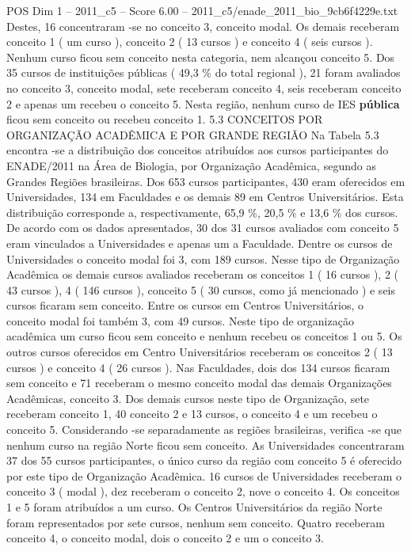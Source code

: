 \begin{textsample}{POS Dim 1 – 2011\_c5 – Score 6.00 – 2011\_c5/enade\_2011\_bio\_9cb6f4229e.txt}
Destes, 16 concentraram -se no conceito 3, conceito modal.
Os demais receberam conceito 1 ( um curso ), conceito 2 ( 13 cursos ) e conceito 4 ( seis cursos ).
Nenhum curso ficou sem conceito nesta categoria, nem alcançou conceito 5.
Dos 35 cursos de instituições públicas ( 49,3 \% do total regional ), 21 foram avaliados no conceito 3, conceito modal, sete receberam conceito 4, seis receberam conceito 2 e apenas um recebeu o conceito 5.
Nesta região, nenhum curso de IES \textbf{pública} ficou sem conceito ou recebeu conceito 1. 5.3 CONCEITOS POR ORGANIZAÇÃO ACADÊMICA E POR GRANDE REGIÃO Na Tabela 5.3 encontra -se a distribuição dos conceitos atribuídos aos cursos participantes do ENADE/2011 na Área de Biologia, por Organização Acadêmica, segundo as Grandes Regiões brasileiras.
Dos 653 cursos participantes, 430 eram oferecidos em Universidades, 134 em Faculdades e os demais 89 em Centros Universitários.
Esta distribuição corresponde a, respectivamente, 65,9 \%, 20,5 \% e 13,6 \% dos cursos.
De acordo com os dados apresentados, 30 dos 31 cursos avaliados com conceito 5 eram vinculados a Universidades e apenas um a Faculdade.
Dentre os cursos de Universidades o conceito modal foi 3, com 189 cursos.
Nesse tipo de Organização Acadêmica os demais cursos avaliados receberam os conceitos 1 ( 16 cursos ), 2 ( 43 cursos ), 4 ( 146 cursos ), conceito 5 ( 30 cursos, como já mencionado ) e seis cursos ficaram sem conceito.
Entre os cursos em Centros Universitários, o conceito modal foi também 3, com 49 cursos.
Neste tipo de organização acadêmica um curso ficou sem conceito e nenhum recebeu os conceitos 1 ou 5.
Os outros cursos oferecidos em Centro Universitários receberam os conceitos 2 ( 13 cursos ) e conceito 4 ( 26 cursos ).
Nas Faculdades, dois dos 134 cursos ficaram sem conceito e 71 receberam o mesmo conceito modal das demais Organizações Acadêmicas, conceito 3.
Dos demais cursos neste tipo de Organização, sete receberam conceito 1, 40 conceito 2 e 13 cursos, o conceito 4 e um recebeu o conceito 5.
Considerando -se separadamente as regiões brasileiras, verifica -se que nenhum curso na região Norte ficou sem conceito.
As Universidades concentraram 37 dos 55 cursos participantes, o único curso da região com conceito 5 é oferecido por este tipo de Organização Acadêmica. 16 cursos de Universidades receberam o conceito 3 ( modal ), dez receberam o conceito 2, nove o conceito 4.
Os conceitos 1 e 5 foram atribuídos a um curso.
Os Centros Universitários da região Norte foram representados por sete cursos, nenhum sem conceito.
Quatro receberam conceito 4, o conceito modal, dois o conceito 2 e um o conceito 3.

\end{textsample}
